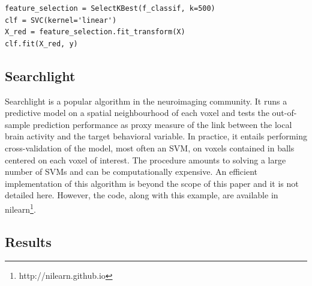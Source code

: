 \documentclass{frontiersSCNS} %
\begin{document}
\begin{lstlisting}
feature_selection = SelectKBest(f_classif, k=500)
clf = SVC(kernel='linear')
X_red = feature_selection.fit_transform(X)
clf.fit(X_red, y)
\end{lstlisting}




\subsection{Searchlight}
\label{searchlight}

Searchlight \citep{kriegeskorte2006} is a popular algorithm in the
neuroimaging community. It runs a predictive model on a spatial
neighbourhood of each voxel and tests the out-of-sample prediction
performance as proxy measure of the link between the local brain activity
and the target behavioral variable. In practice, it entails performing
cross-validation of the model, most often an SVM, on voxels contained in
balls centered on each voxel of interest. The procedure amounts to
solving a large number of SVMs and can be computationally expensive.
An efficient implementation of this algorithm is beyond the scope of this
paper and it is not detailed here. However, the code, along with this example,
are available in nilearn\footnote{http://nilearn.github.io}.

\subsection{Results}
\end{document}
